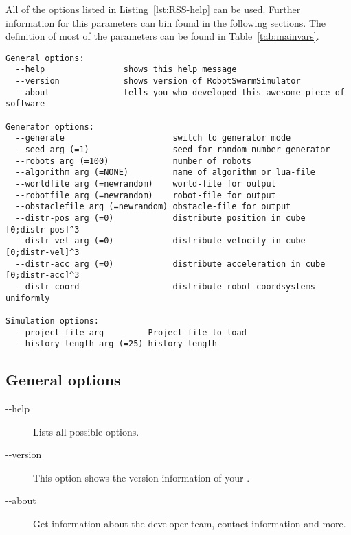 \documentclass[a4paper,halfparskip,11pt,twoside]{scrartcl}
\begin{document}
All of the options listed in Listing~\ref{lst:RSS-help} can be used. Further information for this parameters can bin found in the following sections. The definition of most of the parameters can be found in Table~\ref{tab:mainvars}.

\begin{lstlisting}[caption={RSS Helpline},label=lst:RSS-help]
General options:
  --help                shows this help message
  --version             shows version of RobotSwarmSimulator
  --about               tells you who developed this awesome piece of software

Generator options:
  --generate                      switch to generator mode
  --seed arg (=1)                 seed for random number generator
  --robots arg (=100)             number of robots
  --algorithm arg (=NONE)         name of algorithm or lua-file
  --worldfile arg (=newrandom)    world-file for output
  --robotfile arg (=newrandom)    robot-file for output
  --obstaclefile arg (=newrandom) obstacle-file for output
  --distr-pos arg (=0)            distribute position in cube [0;distr-pos]^3
  --distr-vel arg (=0)            distribute velocity in cube [0;distr-vel]^3
  --distr-acc arg (=0)            distribute acceleration in cube [0;distr-acc]^3
  --distr-coord                   distribute robot coordsystems uniformly

Simulation options:
  --project-file arg         Project file to load
  --history-length arg (=25) history length
\end{lstlisting}


\subsection{General options}
\begin{description}
	\item [-{}-help] Lists all possible options.
	\item [-{}-version] This option shows the version information of your \RSS.
	\item [-{}-about] Get information about the developer team, contact information and more.
\end{description}
\end{document}
